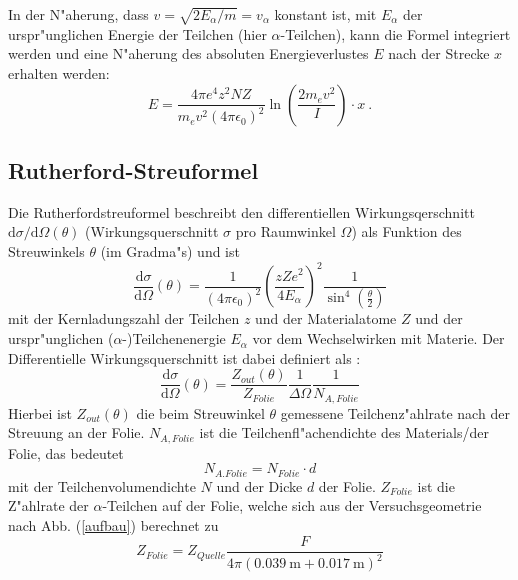     In der N"aherung, dass $v=\sqrt{2E_{\alpha}/m}=v_{\alpha}$ konstant ist, mit $E_{\alpha}$ der urspr"unglichen Energie der Teilchen (hier $\alpha$-Teilchen), kann die Formel integriert werden und eine N"aherung des absoluten Energieverlustes $E$ nach der Strecke $x$ erhalten werden:
    \begin{equation}
      E = \frac{4\pi e^4z^2NZ}{m_ev^2(4\pi \epsilon_0)^2}\ln \left(\frac{2m_ev^2}{I}\right) \cdot x
      \label{bethe} \: .
    \end{equation}



  \subsection{Rutherford-Streuformel}
    Die Rutherfordstreuformel beschreibt den differentiellen Wirkungsqerschnitt $\text{d}\sigma/\text{d}\Omega(\theta)$ (Wirkungsquerschnitt $\sigma$ pro Raumwinkel $\Omega$) als Funktion des Streuwinkels $\theta$ (im Gradma"s) und ist
    \begin{equation}
      \frac{\text{d}\sigma}{\text{d}\Omega}(\theta) = \frac{1}{(4\pi \epsilon_0)^2} \left( \frac{zZe^2}{4E_{\alpha}} \right)^2 \frac{1}{\sin^4(\frac{\theta}{2})}
      \label{ruther}
    \end{equation}
    mit der Kernladungszahl der Teilchen $z$ und der Materialatome $Z$ und der urspr"unglichen ($\alpha$-)Teilchenenergie $E_{\alpha}$ vor dem Wechselwirken mit Materie.
    Der Differentielle Wirkungsquerschnitt ist dabei definiert als \cite{omega}:
    \begin{equation}
      \frac{\text{d}\sigma}{\text{d}\Omega}(\theta) = \frac{Z_{out}(\theta)}{Z_{Folie}} \frac{1}{\Delta \Omega} \frac{1}{N_{A,Folie}}
    \end{equation}
    Hierbei ist $Z_{out}(\theta)$ die beim Streuwinkel $\theta$ gemessene Teilchenz"ahlrate nach der Streuung an der Folie.
    $N_{A,Folie}$ ist die Teilchenfl"achendichte des Materials/der Folie, das bedeutet
    \begin{equation}
      N_{A.Folie} = N_{Folie} \cdot d
    \end{equation}
    mit der Teilchenvolumendichte $N$ und der Dicke $d$ der Folie.
    $Z_{Folie}$ ist die Z"ahlrate der $\alpha$-Teilchen auf der Folie, welche sich aus der Versuchsgeometrie nach Abb. (\ref{aufbau}) berechnet zu
    \begin{equation}
      Z_{Folie}=Z_{Quelle}\frac{F}{4\pi(\SI{0.039}{\meter}+\SI{0,017}{\meter})^2}
    \end{equation}
